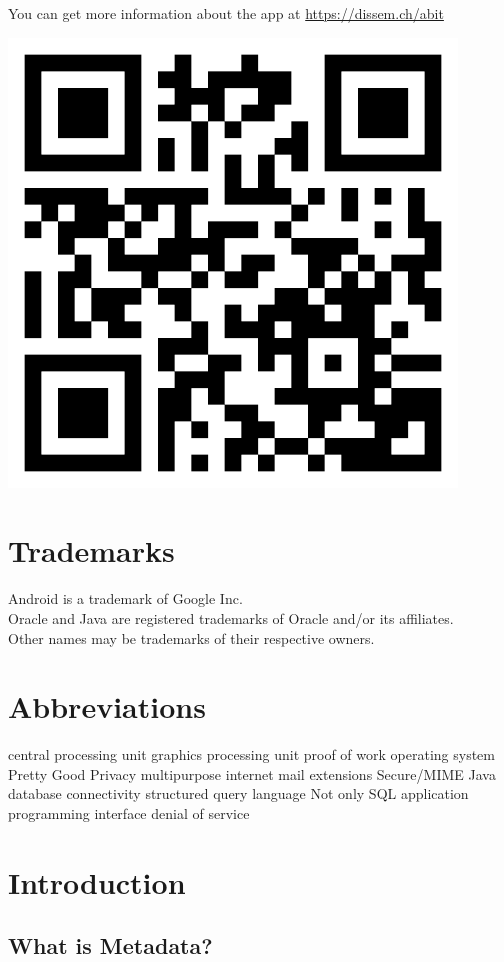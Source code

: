 \documentclass{bfh}
\begin{document}
  You can get more information about the app at \url{https://dissem.ch/abit}

  \begin{center}
    \includegraphics[width=0.4 \textwidth]{images/QR_abit_webpage.pdf}
  \end{center}


  \newpage
  \section*{Trademarks}
  Android is a trademark of Google Inc.\\
  Oracle and Java are registered trademarks of Oracle and/or its affiliates.\\
  Other names may be trademarks of their respective owners.

  \section*{Abbreviations}
  \begin{acronym}[S/MIME ]
        {central processing unit}
        {graphics processing unit}
        {proof of work}
         {operating system}
        {Pretty Good Privacy}
       {multipurpose internet mail extensions}
     {Secure/\acs{MIME}}
       {Java database connectivity}
        {structured query language}
      {Not only \acs{SQL}}
        {application programming interface}
        {denial of service}
  \end{acronym}

  \newpage

  \section{Introduction}

  \subsection{What is Metadata?}
\end{document}

